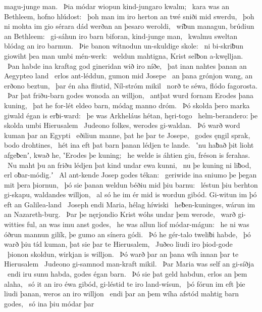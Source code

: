 magu-junge man. \hld\ Þia módar wiopun
kind-jungaro kwalm; \hld\ kara was an Bethleem,
hofno hlúdost: \hld\ þoh man im iro herton an twé
sniði mid swerdu, \hld\ þoh ni mohta im gio sérara dád
werðan an þesaro weroldi, \hld\ wíƀun managun,
brúdiun an Bethleem: \hld\ gi-sáhun iro barn biforan,
kind-junge man, \hld\ kwalmu sweltan
blódag an iro barmun. \hld\ Þie banon wítnodun
un-skuldige skole: \hld\ ni bi-skriƀun giowiht
þea man umbi mén-werk: \hld\ weldun mahtigna,
Krist selƀon a-kwęlljan. \hld\ Þan habde ina kraftag god
gineridan wið iro níðe, \hld\ þat inan nahtes þanan
an Aegypteo land \hld\ erlos ant-léddun,
gumon mid Josepe \hld\ an þana grónjon wang,
an erðono beztun, \hld\ þar én aha fliutid,
Níl-stróm mikil \hld\ norð te séwa,
flódo fagorosta. \hld\ Þar þat friðu-barn godes
wonoda an willjon, \hld\ antþat wurd fornam
Erodes þana kuning, \hld\ þat he for-lét eldeo barn,
módag manno dróm. \hld\ Þó skolda þero marka giwald
égan is erƀi-ward: \hld\ þe was Arkheláus
hétan, hęri-togo \hld\ helm-berandero:
þe skolda umbi Hierusalem \hld\ Judeono folkes,
werodes gi-waldan. \hld\ Þó warð word kuman
þar an Egypti \hld\ eðiliun manne,
þat he þar te Josepe, \hld\ godes ęngil sprak,
bodo drohtines, \hld\ hét ina eft þat barn þanan
lédjen te lande. \hld\ ʽnu haƀað þit lioht afgeƀenʼ, kwað he,
ʽErodes þe kuning; \hld\ he welde is áhtien giu,
fréson is ferahas. \hld\ Nu maht þu an friðu lédjen
þat kind undar ewa kunni, \hld\ nu þe kuning ni liƀod,
erl oƀar-módig.ʼ \hld\ Al ant-kende
Josep godes tékan: \hld\ geriwide ina sniumo
þe þegan mit þera þiornun, \hld\ þó sie þanan weldun
béðiu mid þiu barnu: \hld\ léstun þiu berhton gi-skapu,
waldandes willjon, \hld\ al só he im ér mid is wordun gibód.
Gi-witun im þó eft an Galilea-land \hld\ Joseph endi Maria,
hélag híwiski \hld\ heƀen-kuninges,
wárun im an Nazareth-burg. \hld\ Þar þe nęrjondio Krist
wóhs undar þem werode, \hld\ warð gi-witties ful,
an was imu anst godes, \hld\ he was allun liof
módar-mágun: \hld\ he ni was óðrun mannun gilík,
þe gumo an sínera gódi. \hld\ Þó he gér-talo
tweliƀi habde, \hld\ þó warð þiu tíd kuman,
þat sie þar te Hierusalem, \hld\ Juðeo liudi
iro þiod-gode \hld\ þionon skoldun,
wirkjan is willjon. \hld\ Þó warð þar an þana wíh innan
þar te Hierusalem \hld\ Judeono gi-samnod
man-kraft mikil. \hld\ Þar Maria was
self an gi-síðja \hld\ endi iru sunu habda,
godes égan barn. \hld\ Þó sie þat geld habdun,
erlos an þem alaha, \hld\ só it an iro éwa gibód,
gi-léstid te iro land-wísun, \hld\ þó fórun im eft þie liudi þanan,
weros an iro willjon \hld\ endi þar an þem wíha afstód
mahtig barn godes, \hld\ só ina þiu módar þar
